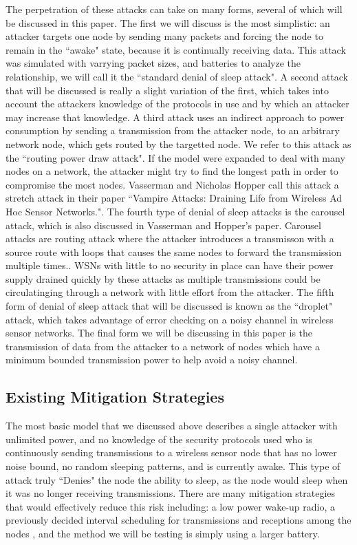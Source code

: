 The perpetration of these attacks can take on many forms, several of which will be discussed in this paper. The first we will discuss is the most simplistic: an attacker targets one node by sending many packets and forcing the
node to remain in the ``awake" state, because it is continually receiving data. This attack was simulated with varrying packet sizes, and batteries to analyze the relationship, we will call it the ``standard denial of sleep attack". A second attack that will be discussed is really a 
slight variation of the first, which takes into account the attackers knowledge of the protocols in use and by which an attacker may increase that knowledge\cite{4476299}. A third attack uses an indirect approach to power 
consumption by sending a transmission from the attacker node, to an arbitrary network node, which gets routed by the targetted node. We refer to this attack as the ``routing power draw attack". If the model were expanded to deal with many nodes on a network, the attacker might try to 
find the longest path in order to compromise the most nodes. Vasserman and Nicholas Hopper call this attack a stretch attack in their paper ``Vampire Attacks: Draining Life from Wireless Ad Hoc Sensor Networks."\cite{6112758}.
The fourth type of denial of sleep attacks is the carousel attack, which is also discussed in Vasserman and Hopper's paper. Carousel attacks are routing attack where the attacker introduces a transmisson with a source route with loops that causes the same nodes to forward the transmission multiple times\cite{6112758}.. WSNs with little to no security in place can have their power supply drained quickly by these attacks as multiple transmissions could be circulatinging through a network with little effort from the attacker.
The fifth form of denial of sleep attack that will be discussed is known as the ``droplet" attack, which takes advantage of error checking on a noisy channel in wireless sensor networks\cite{6680296}. The final form we will be 
discussing in this paper is the transmission of data from the attacker to a network of nodes which have a minimum bounded transmission power to help avoid a noisy channel.  

\subsection{Existing Mitigation Strategies}

The most basic model that we discussed above describes a single attacker with unlimited power, and no knowledge of the security protocols used who is continuously sending transmissions to a wireless sensor node that has no lower 
noise bound, no random sleeping patterns, and is currently awake. This type of attack truly ``Denies" the node the ability to sleep, as the node would sleep when it was no longer receiving transmissions. There are many mitigation
strategies that would effectively reduce this risk including: a low power wake-up radio\cite{5211020}, a previously decided interval scheduling for transmissions and receptions among the nodes \cite{4476299}, and the method we will be testing
is simply using a larger battery.

